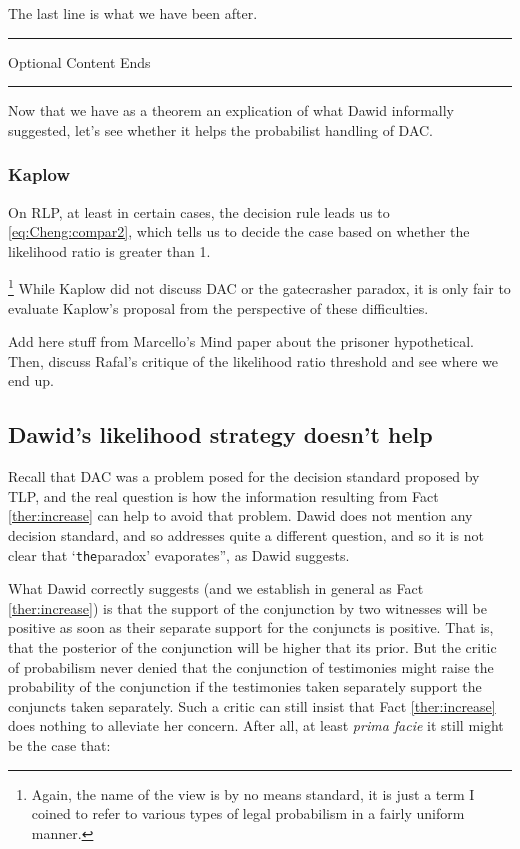 \documentclass[10pt,dvipsnames,enabledeprecatedfontcommands]{scrartcl}
\newcommand{\intermezzob}{\nopagebreak 
	\begin{minipage}[c]{13cm}
	\begin{center}\rule{10cm}{0.4pt}

	\tiny{\sc Optional Content Ends}
	
	\vspace{-1mm}
	
	\rule{10cm}{0.4pt}\end{center}
	\end{minipage}
	}
\begin{document}
\vspace{1mm}

The last line is what we have been after.

\intermezzob

Now that we have as a theorem an explication of what Dawid informally
suggested, let's see whether it helps the probabilist handling of DAC.

\subsubsection{Kaplow}\label{kaplow-1}

On RLP, at least in certain cases, the decision rule leads us to
\eqref{eq:Cheng:compar2}, which tells us to decide the case based on
whether the likelihood ratio is greater than 1.

\footnote{Again, the name of the view is by no means standard, it is  just a term I coined to refer to various types of legal probabilism in a fairly uniform manner.}
While Kaplow did not discuss DAC or the gatecrasher paradox, it is only
fair to evaluate Kaplow's proposal from the perspective of these
difficulties.

Add here stuff from Marcello's Mind paper about the prisoner
hypothetical. Then, discuss Rafal's critique of the likelihood ratio
threshold and see where we end up.

\subsection{Dawid's likelihood strategy doesn't
help}\label{dawids-likelihood-strategy-doesnt-help}

Recall that DAC was a problem posed for the decision standard proposed
by TLP, and the real question is how the information resulting from Fact
\ref{ther:increase} can help to avoid that problem. Dawid does not
mention any decision standard, and so addresses quite a different
question, and so it is not clear that `\texttt{the}paradox'
evaporates'', as Dawid suggests.

What Dawid correctly suggests (and we establish in general as Fact
\ref{ther:increase}) is that the support of the conjunction by two
witnesses will be positive as soon as their separate support for the
conjuncts is positive. That is, that the posterior of the conjunction
will be higher that its prior. But the critic of probabilism never
denied that the conjunction of testimonies might raise the probability
of the conjunction if the testimonies taken separately support the
conjuncts taken separately. Such a critic can still insist that Fact
\ref{ther:increase} does nothing to alleviate her concern. After all, at
least \emph{prima facie} it still might be the case that:
\end{document}
